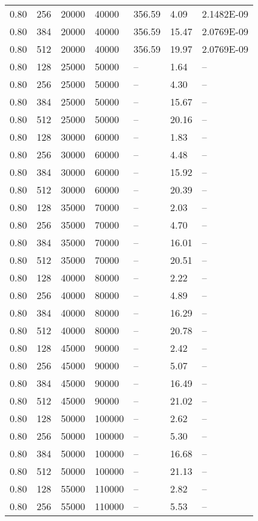 \begin{tabular}{l|l|l|l|l|l|l}
0.80 & 256 &  20000 &  40000 & 356.59 &  4.09 & 2.1482E-09\\
0.80 & 384 &  20000 &  40000 & 356.59 & 15.47 & 2.0769E-09\\
0.80 & 512 &  20000 &  40000 & 356.59 & 19.97 & 2.0769E-09\\
0.80 & 128 &  25000 &  50000 & -- &  1.64 & --\\
0.80 & 256 &  25000 &  50000 & -- &  4.30 & --\\
0.80 & 384 &  25000 &  50000 & -- & 15.67 & --\\
0.80 & 512 &  25000 &  50000 & -- & 20.16 & --\\
0.80 & 128 &  30000 &  60000 & -- &  1.83 & --\\
0.80 & 256 &  30000 &  60000 & -- &  4.48 & --\\
0.80 & 384 &  30000 &  60000 & -- & 15.92 & --\\
0.80 & 512 &  30000 &  60000 & -- & 20.39 & --\\
0.80 & 128 &  35000 &  70000 & -- &  2.03 & --\\
0.80 & 256 &  35000 &  70000 & -- &  4.70 & --\\
0.80 & 384 &  35000 &  70000 & -- & 16.01 & --\\
0.80 & 512 &  35000 &  70000 & -- & 20.51 & --\\
0.80 & 128 &  40000 &  80000 & -- &  2.22 & --\\
0.80 & 256 &  40000 &  80000 & -- &  4.89 & --\\
0.80 & 384 &  40000 &  80000 & -- & 16.29 & --\\
0.80 & 512 &  40000 &  80000 & -- & 20.78 & --\\
0.80 & 128 &  45000 &  90000 & -- &  2.42 & --\\
0.80 & 256 &  45000 &  90000 & -- &  5.07 & --\\
0.80 & 384 &  45000 &  90000 & -- & 16.49 & --\\
0.80 & 512 &  45000 &  90000 & -- & 21.02 & --\\
0.80 & 128 &  50000 & 100000 & -- &  2.62 & --\\
0.80 & 256 &  50000 & 100000 & -- &  5.30 & --\\
0.80 & 384 &  50000 & 100000 & -- & 16.68 & --\\
0.80 & 512 &  50000 & 100000 & -- & 21.13 & --\\
0.80 & 128 &  55000 & 110000 & -- &  2.82 & --\\
0.80 & 256 &  55000 & 110000 & -- &  5.53 & --\\

\end{tabular}
